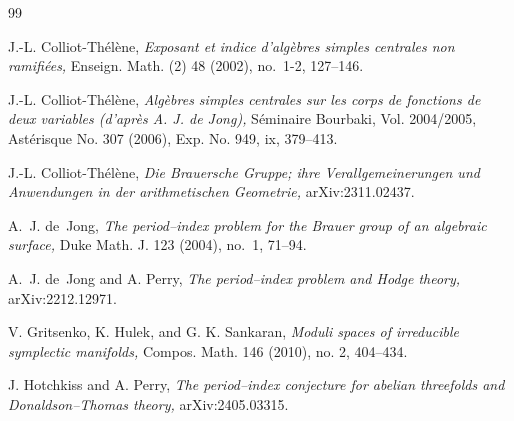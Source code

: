 \documentclass[11pt]{amsart}
\theoremstyle{plain}
\theoremstyle{definition}
\theoremstyle{remark}
\begin{document}
\begin{thebibliography}{99}



 J.-L. Colliot-Th\'el\`ene, {\em Exposant et indice d'alg\`ebres simples centrales non ramifi\'ees,} Enseign. Math. (2) 48 (2002), no.~1-2, 127--146.

 J.-L. Colliot-Th\'el\`ene, {\em Alg\`ebres simples centrales sur les corps de fonctions de deux variables (d'apr\`es A. J. de Jong),} S\'eminaire Bourbaki, Vol. 2004/2005, Ast\'erisque No. 307 (2006), Exp. No. 949, ix, 379--413.

 J.-L. Colliot-Th\'el\`ene, {\em Die Brauersche Gruppe; ihre Verallgemeinerungen und Anwendungen in der arithmetischen Geometrie,} arXiv:2311.02437.


 A.~J. de~Jong, {\em The period--index problem for the Brauer group of an algebraic surface,} Duke Math. J. 123 (2004), no.~1, 71--94.

 A.~J. de~Jong and A. Perry, {\em The period--index problem and Hodge theory,} arXiv:2212.12971.


 V. Gritsenko, K. Hulek, and G. K. Sankaran, {\em Moduli spaces of irreducible symplectic manifolds,} Compos. Math. 146 (2010), no. 2, 404--434.


 J. Hotchkiss and A. Perry, {\em The period--index conjecture for abelian threefolds and Donaldson--Thomas theory,} arXiv:2405.03315.


\end{thebibliography}
\end{document}
